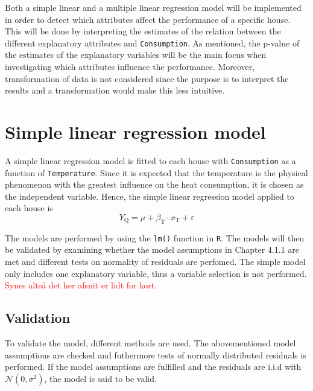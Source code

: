 \noindent Both a simple linear and a multiple linear regression model will be implemented in order to detect which attributes affect the performance of a specific house. This will be done by interpreting the estimates of the relation between the different explanatory attributes and \texttt{Consumption}. As mentioned, the p-value of the estimates of the explanatory variables will be the main focus when investigating which attributes influence the performance. Moreover, transformation of data is not considered since the purpose is to interpret the results and a transformation would make this less intuitive.

\section{Simple linear regression model}
A simple linear regression model is fitted to each house with \texttt{Consumption} as a function of \texttt{Temperature}. Since it is expected that the temperature is the physical phenomenon with the greatest influence on the heat consumption, it is chosen as the independent variable. Hence, the simple linear regression model applied to each house is
\begin{equation}
    Y_{\text{Q}} = \mu + \beta_{\text{T}} \cdot x_{\text{T}} + \varepsilon
    \label{eq: simple}
\end{equation}

\noindent The models are performed by using the \texttt{lm()} function in \texttt{R}. The models will then be validated by examining whether the model assumptions in Chapter 4.1.1 are met and different tests on normality of residuals are perfomed. The simple model only includes one explanatory variable, thus a variable selection is not performed. \textcolor{red}{Synes altså det her afsnit er lidt for kort.}

\subsection{Validation}
To validate the model, different methods are used. The abovementioned model assumptions are checked and futhermore tests of normally distributed residuals is performed. If the model assumptions are fulfilled and the residuals are i.i.d with $\mathcal{N}(0,\sigma^2)$, the model is said to be valid. \\

